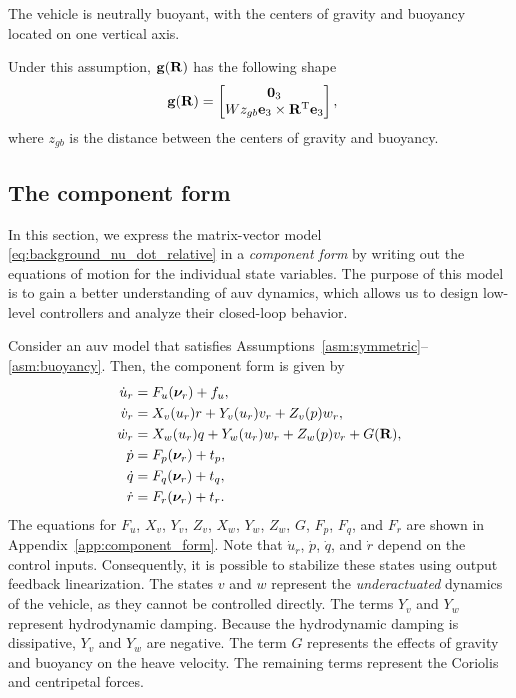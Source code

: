 \begin{asm}
    \label{asm:buoyancy}
    The vehicle is neutrally buoyant, with the centers of gravity and buoyancy located on one vertical axis.
\end{asm}
\noindent Under this assumption, $\mathbf{g}(\mathbf{R})$ has the following shape
\begin{align}
    \mathbf{g}(\mathbf{R}) &= \begin{bmatrix}
        \mathbf{0}_3 \\ Wz_{gb} \mathbf{e}_3 \times \mathbf{R}^{\mathrm{T}} \mathbf{e}_3
    \end{bmatrix},
    \label{eq:gravity}
\end{align}
where $z_{gb}$ is the distance between the centers of gravity and buoyancy.

\subsection{The component form}
In this section, we express the matrix-vector model \eqref{eq:background_nu_dot_relative} in a \emph{component form} by writing out the equations of motion for the individual state variables.
The purpose of this model is to gain a better understanding of \gls{auv} dynamics, which allows us to design low-level controllers and analyze their closed-loop behavior.

Consider an \gls{auv} model that satisfies Assumptions~\ref{asm:symmetric}--\ref{asm:buoyancy}.
Then, the component form is given by
\begin{subequations}
    \begin{align}
        \dot{u}_r &= F_u(\bm{\nu}_r) + f_u, \\
        \dot{v}_r &= X_v(u_r)r + Y_v(u_r)v_r + Z_v(p)w_r, \\
        \dot{w}_r &= X_w(u_r)q + Y_w(u_r)w_r + Z_w(p)v_r + G(\mathbf{R}), \\
        \dot{p} &= F_p(\bm{\nu}_r) + t_p, \\
        \dot{q} &= F_q(\bm{\nu}_r) + t_q, \\
        \dot{r} &= F_r(\bm{\nu}_r) + t_r.
    \end{align}
    \label{eq:background_component_form}
\end{subequations}
The equations for $F_u$, $X_v$, $Y_v$, $Z_v$, $X_w$, $Y_w$, $Z_w$, $G$, $F_p$, $F_q$, and $F_r$ are shown in Appendix~\ref{app:component_form}.
Note that $\dot{u}_r$, $\dot{p}$, $\dot{q}$, and $\dot{r}$ depend on the control inputs.
Consequently, it is possible to stabilize these states using output feedback linearization.
The states $v$ and $w$ represent the \emph{underactuated} dynamics of the vehicle, as they cannot be controlled directly.
The terms $Y_v$ and $Y_w$ represent hydrodynamic damping.
Because the hydrodynamic damping is dissipative, $Y_v$ and $Y_w$ are negative.
The term $G$ represents the effects of gravity and buoyancy on the heave velocity.
The remaining terms represent the Coriolis and centripetal forces.

